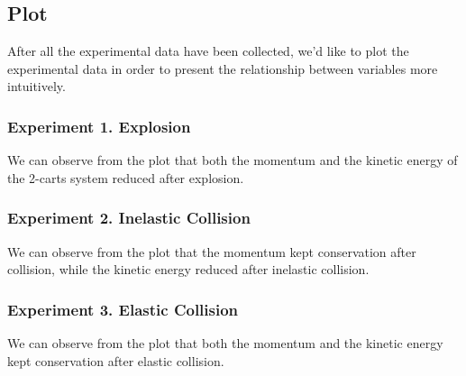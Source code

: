 \documentclass[12pt]{article}
\begin{document}
	\subsection{Plot}
	After all the experimental data have been collected, we'd like to plot the experimental data in order to present the relationship between variables more intuitively.
	\subsubsection{Experiment 1. Explosion}
	\begin{figure}[H]
		\centering
	\end{figure}
	We can observe from the plot that both the momentum and the kinetic energy of the 2-carts system reduced after explosion.
	\subsubsection{Experiment 2. Inelastic Collision}
	\begin{figure}[H]
		\centering
	\end{figure}
	We can observe from the plot that the momentum kept conservation after collision, while the kinetic energy reduced after inelastic collision.
	\subsubsection{Experiment 3. Elastic Collision}
	\begin{figure}[H]
		\centering
	\end{figure}
	We can observe from the plot that both the momentum and the kinetic energy kept conservation after elastic collision.
	
\end{document}
